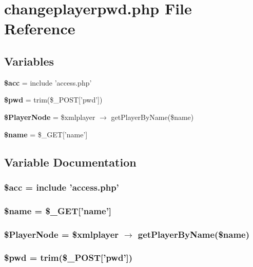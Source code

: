 \section{changeplayerpwd.php File Reference}
\label{changeplayerpwd_8php}


\subsection*{Variables}
\begin{CompactItemize}
\item 
{\bf \$acc} = include 'access.php'
\item 
{\bf \$pwd} = trim(\$\_\-POST['pwd'])
\item 
{\bf \$Player\-Node} = \$xmlplayer $\rightarrow$ get\-Player\-By\-Name(\$name)
\item 
{\bf \$name} = \$\_\-GET['name']
\end{CompactItemize}


\subsection{Variable Documentation}
\subsubsection{\setlength{\rightskip}{0pt plus 5cm}\$acc = include 'access.php'}\label{changeplayerpwd_8php_542926c588a05eb69553d79c83cf73da}


\subsubsection{\setlength{\rightskip}{0pt plus 5cm}\$name = \$\_\-GET['name']}\label{changeplayerpwd_8php_b2fc40d43824ea3e1ce5d86dee0d763b}


\subsubsection{\setlength{\rightskip}{0pt plus 5cm}\$Player\-Node = \$xmlplayer $\rightarrow$ get\-Player\-By\-Name(\$name)}\label{changeplayerpwd_8php_90668b8131a1c418248aef66339e32d6}


\subsubsection{\setlength{\rightskip}{0pt plus 5cm}\$pwd = trim(\$\_\-POST['pwd'])}\label{changeplayerpwd_8php_12e4252e778952d356721bc655cff8c8}


